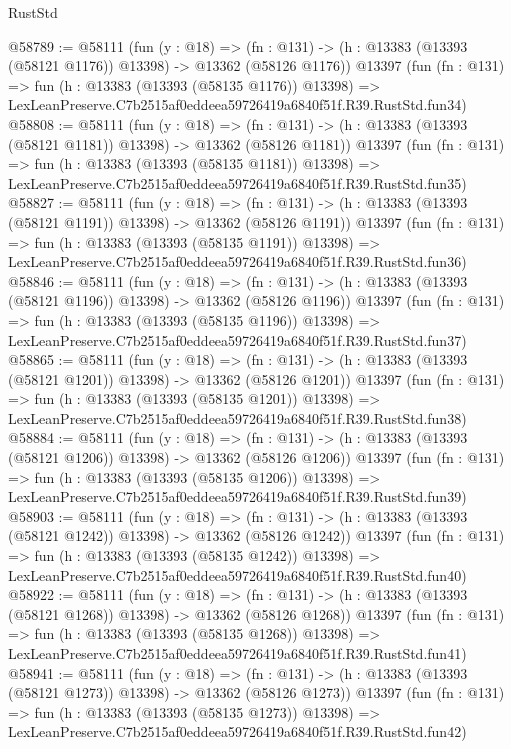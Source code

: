 \begin{lexlean}{RustStd}
\begin{coremodule}
@58789 := @58111
    (fun (y : @18) =>
    (fn : @131) -> (h : @13383 (@13393 (@58121 @1176)) @13398) -> @13362 (@58126 @1176))
    @13397
    (fun (fn : @131) =>
    fun (h : @13383 (@13393 (@58135 @1176)) @13398) =>
    LexLeanPreserve.C7b2515af0eddeea59726419a6840f51f.R39.RustStd.fun34)
@58808 := @58111
    (fun (y : @18) =>
    (fn : @131) -> (h : @13383 (@13393 (@58121 @1181)) @13398) -> @13362 (@58126 @1181))
    @13397
    (fun (fn : @131) =>
    fun (h : @13383 (@13393 (@58135 @1181)) @13398) =>
    LexLeanPreserve.C7b2515af0eddeea59726419a6840f51f.R39.RustStd.fun35)
@58827 := @58111
    (fun (y : @18) =>
    (fn : @131) -> (h : @13383 (@13393 (@58121 @1191)) @13398) -> @13362 (@58126 @1191))
    @13397
    (fun (fn : @131) =>
    fun (h : @13383 (@13393 (@58135 @1191)) @13398) =>
    LexLeanPreserve.C7b2515af0eddeea59726419a6840f51f.R39.RustStd.fun36)
@58846 := @58111
    (fun (y : @18) =>
    (fn : @131) -> (h : @13383 (@13393 (@58121 @1196)) @13398) -> @13362 (@58126 @1196))
    @13397
    (fun (fn : @131) =>
    fun (h : @13383 (@13393 (@58135 @1196)) @13398) =>
    LexLeanPreserve.C7b2515af0eddeea59726419a6840f51f.R39.RustStd.fun37)
@58865 := @58111
    (fun (y : @18) =>
    (fn : @131) -> (h : @13383 (@13393 (@58121 @1201)) @13398) -> @13362 (@58126 @1201))
    @13397
    (fun (fn : @131) =>
    fun (h : @13383 (@13393 (@58135 @1201)) @13398) =>
    LexLeanPreserve.C7b2515af0eddeea59726419a6840f51f.R39.RustStd.fun38)
@58884 := @58111
    (fun (y : @18) =>
    (fn : @131) -> (h : @13383 (@13393 (@58121 @1206)) @13398) -> @13362 (@58126 @1206))
    @13397
    (fun (fn : @131) =>
    fun (h : @13383 (@13393 (@58135 @1206)) @13398) =>
    LexLeanPreserve.C7b2515af0eddeea59726419a6840f51f.R39.RustStd.fun39)
@58903 := @58111
    (fun (y : @18) =>
    (fn : @131) -> (h : @13383 (@13393 (@58121 @1242)) @13398) -> @13362 (@58126 @1242))
    @13397
    (fun (fn : @131) =>
    fun (h : @13383 (@13393 (@58135 @1242)) @13398) =>
    LexLeanPreserve.C7b2515af0eddeea59726419a6840f51f.R39.RustStd.fun40)
@58922 := @58111
    (fun (y : @18) =>
    (fn : @131) -> (h : @13383 (@13393 (@58121 @1268)) @13398) -> @13362 (@58126 @1268))
    @13397
    (fun (fn : @131) =>
    fun (h : @13383 (@13393 (@58135 @1268)) @13398) =>
    LexLeanPreserve.C7b2515af0eddeea59726419a6840f51f.R39.RustStd.fun41)
@58941 := @58111
    (fun (y : @18) =>
    (fn : @131) -> (h : @13383 (@13393 (@58121 @1273)) @13398) -> @13362 (@58126 @1273))
    @13397
    (fun (fn : @131) =>
    fun (h : @13383 (@13393 (@58135 @1273)) @13398) =>
    LexLeanPreserve.C7b2515af0eddeea59726419a6840f51f.R39.RustStd.fun42)

\end{coremodule}
\end{lexlean}
